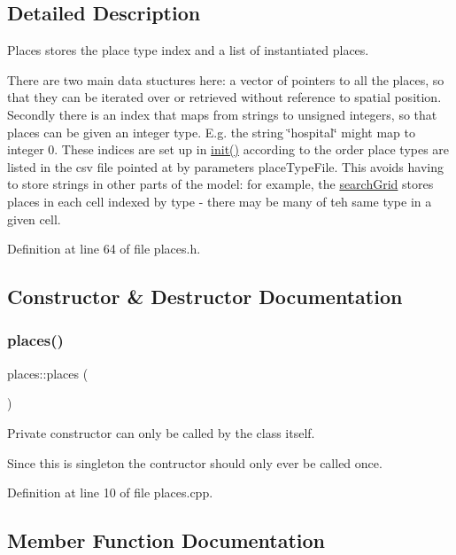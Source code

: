 \subsection{Detailed Description}
Places stores the place type index and a list of instantiated places. 

There are two main data stuctures here\+: a vector of pointers to all the places, so that they can be iterated over or retrieved without reference to spatial position. Secondly there is an index that maps from strings to unsigned integers, so that places can be given an integer type. E.\+g. the string \char`\"{}hospital\char`\"{} might map to integer 0. These indices are set up in \mbox{\hyperlink{classplaces_ad126c2796c4fecad43f8e237ffde786d}{init()}} according to the order place types are listed in the csv file pointed at by parameters place\+Type\+File. This avoids having to store strings in other parts of the model\+: for example, the \mbox{\hyperlink{classsearchGrid}{search\+Grid}} stores places in each cell indexed by type -\/ there may be many of teh same type in a given cell. 

Definition at line 64 of file places.\+h.



\subsection{Constructor \& Destructor Documentation}
\mbox{\label{classplaces_a1c4116c838392a6d35169126334f3f61}} 
\subsubsection{\texorpdfstring{places()}{places()}}
{\footnotesize\ttfamily places\+::places (\begin{DoxyParamCaption}{ }\end{DoxyParamCaption})\hspace{0.3cm}{\ttfamily [protected]}}



Private constructor can only be called by the class itself. 

Since this is singleton the contructor should only ever be called once. 

Definition at line 10 of file places.\+cpp.



\subsection{Member Function Documentation}
\mbox{\label{classplaces_acb5dbcd8606a8a1ffbebc9fb5a3c8a5e}} 
